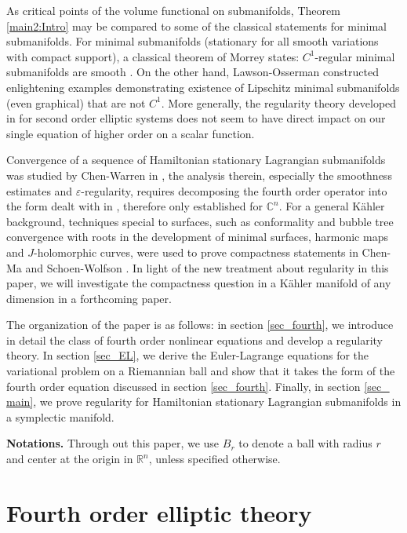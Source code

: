 \documentclass[12pt,leqno]{amsart}%
\theoremstyle{plain}
\numberwithin{equation}{section}
\theoremstyle{definition}
\begin{document}
As critical points of the volume functional on submanifolds, Theorem
\ref{main2:Intro} may be compared to some of the
classical statements for minimal submanifolds. For minimal submanifolds
(stationary for all smooth variations with compact support), a classical
theorem of Morrey states: $C^{1}$-regular minimal submanifolds are smooth
\cite[Theorem 10.7.1]{MorreyBook}. On the other hand, Lawson-Osserman
\cite{LO} constructed enlightening examples demonstrating existence of
Lipschitz minimal submanifolds (even graphical) that are not $C^{1}$. More
generally, the regularity theory developed in \cite{GM} for second order
elliptic systems does not seem to have direct impact on our single equation of
higher order on a scalar function.

Convergence of a sequence of Hamiltonian stationary Lagrangian submanifolds
was studied by Chen-Warren in \cite{CW2}, the analysis therein, especially the
smoothness estimates and $\varepsilon$-regularity, requires decomposing the
fourth order operator into the form dealt with in \cite{CW}, therefore only
established for $\mathbb{C}^{n}$. For a general K\"ahler background,
techniques special to surfaces, such as conformality and bubble tree
convergence with roots in the development of minimal surfaces, harmonic maps
and $J$-holomorphic curves, were used to prove compactness statements in
Chen-Ma \cite{ChenMa} and Schoen-Wolfson \cite{SW}. In light of the new
treatment about regularity in this paper, we will investigate the compactness
question in a K\"ahler manifold of any dimension in a forthcoming paper.

The organization of the paper is as follows: in section \ref{sec_fourth}, we
introduce in detail the class of fourth order nonlinear equations and develop
a regularity theory. In section \ref{sec_EL}, we derive the Euler-Lagrange
equations for the variational problem on a Riemannian ball and show that it
takes the form of the fourth order equation discussed in section
\ref{sec_fourth}. Finally, in section \ref{sec_ main}, we prove regularity for
Hamiltonian stationary Lagrangian submanifolds in a symplectic manifold.

\bigskip

\textbf{Notations.} Through out this paper, we use $B_{r}$ to denote a ball
with radius $r$ and center at the origin in $\mathbb{R}^{n}$, unless specified otherwise.

\section{Fourth order elliptic theory}
\end{document}
